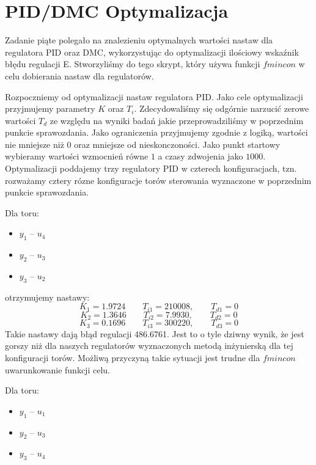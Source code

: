 \chapter{PID/DMC Optymalizacja}
Zadanie piąte polegało na znalezieniu optymalnych wartości nastaw dla regulatora PID oraz DMC, wykorzystując do optymalizacji ilościowy wskaźnik błędu regulacji E.
Stworzyliśmy do tego skrypt, który używa funkcji $fmincon$ w celu dobierania nastaw dla regulatorów. 


Rozpoczniemy od optymalizacji nastaw regulatora PID. Jako cele optymalizacji przyjmujemy parametry $K$ oraz $T_i$. Zdecydowaliśmy się odgórnie narzucić zerowe wartości
$T_d$ ze względu na wyniki badań jakie przeprowadziliśmy w poprzednim punkcie sprawozdania. 
Jako ograniczenia przyjmujemy zgodnie z logiką, wartości nie mniejsze niż 0 oraz mniejsze od nieskonczoności.
Jako punkt startowy wybieramy wartości wzmocnień równe $1$ a  czasy zdwojenia jako $1000$. 
Optymalizacji poddajemy trzy regulatory PID w czterech konfiguracjach, tzn. 
rozważamy cztery rózne konfiguracje torów sterowania wyznaczone w poprzednim punkcie sprawozdania. 

Dla toru:
\begin{itemize}
  \item $y_1$ -- $u_4$
 \item $y_2$ -- $u_3$
 \item $y_3$ -- $u_2$
\end{itemize}

otrzymujemy nastawy:
\begin{equation}
  K_1 = \num{1.9724} \qquad T_{i1} = \num{210008}, \qquad T_{d1} = 0 \nonumber
\end{equation}
\begin{equation}
  K_2 = \num{1.3646} \qquad T_{i2} = \num{7.9930}, \qquad T_{d2} = 0
\end{equation}
\begin{equation}
  K_3 = \num{0.1696} \qquad T_{i3} = \num{300220}, \qquad T_{d3} = 0 \nonumber
\end{equation}
Takie nastawy dają błąd regulacji \num{486.6761}. Jest to o tyle dziwny wynik, że jest gorszy niż
dla naszych regulatorów wyznaczonych metodą inżynierską dla tej konfiguracji torów. Możliwą przyczyną
takie sytuacji jest trudne dla $fmincon$ uwarunkowanie funkcji celu. 


Dla toru:
\begin{itemize}
  \item $y_1$ -- $u_1$
 \item $y_2$ -- $u_3$
 \item $y_3$ -- $u_4$
\end{itemize}

